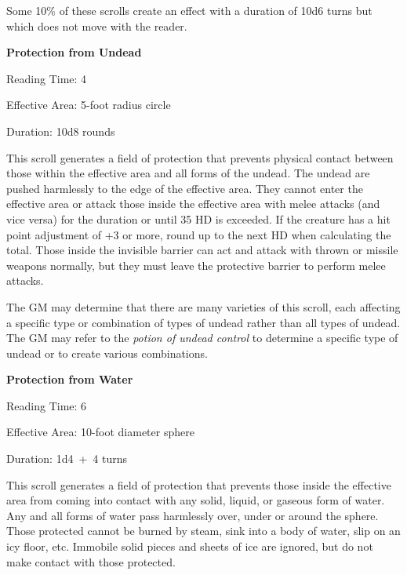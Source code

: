 \begin{multicols}{2}
Some 10\% of these scrolls create an effect with a duration of 10d6 turns but which does not move with the reader.

\vspace{1em}
\noindent \begin{minipage}{\columnwidth}

\noindent \textbf{Protection from Undead}

\noindent Reading Time: 4

\noindent Effective Area: 5-foot radius circle

\noindent Duration: 10d8 rounds

\end{minipage}

This scroll generates a field of protection that prevents physical contact between those within the effective area and all forms of the undead.  The undead are pushed harmlessly to the edge of the effective area.  They cannot enter the effective area or attack those inside the effective area with melee attacks (and vice versa) for the duration or until 35 HD is exceeded.  If the creature has a hit point adjustment of +3 or more, round up to the next HD when calculating the total.  Those inside the invisible barrier can act and attack with thrown or missile weapons normally, but they must leave the protective barrier to perform melee attacks.  

The GM may determine that there are many varieties of this scroll, each affecting a specific type or combination of types of undead rather than all types of undead.  The GM may refer to the \textit{potion of undead control} to determine a specific type of undead or to create various combinations.

\vspace{1em}
\noindent \begin{minipage}{\columnwidth}

\noindent \textbf{Protection from Water}

\noindent Reading Time: 6

\noindent Effective Area: 10-foot diameter sphere

\noindent Duration: 1d4~+~4 turns

\end{minipage}

This scroll generates a field of protection that prevents those inside the effective area from coming into contact with any solid, liquid, or gaseous form of water.  Any and all forms of water pass harmlessly over, under or around the sphere.  Those protected cannot be burned by steam, sink into a body of water, slip on an icy floor, etc.  Immobile solid pieces and sheets of ice are ignored, but do not make contact with those protected. 


\end{multicols}
